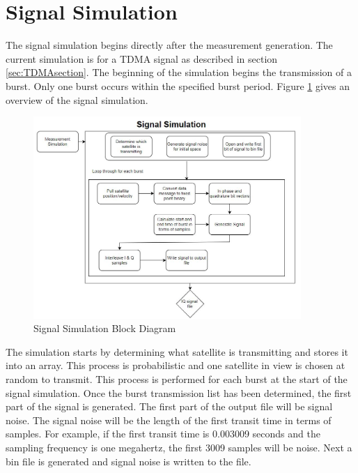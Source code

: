 \documentclass[12pt]{report}
\begin{document}
\section{Signal Simulation}

The signal simulation begins directly after the measurement generation. The current simulation is for a TDMA signal as described in section \ref{sec:TDMAsection}. The beginning of the simulation begins the transmission of a burst. Only one burst occurs within the specified burst period. Figure \ref{fig:SigSimBlock} gives an overview of the signal simulation.

\begin{figure}[h]
    \centering
    \includegraphics[width=4in]{SignalSimBlock}
    \caption{Signal Simulation Block Diagram}
    \label{fig:SigSimBlock}
\end{figure}



The simulation starts by determining what satellite is transmitting and stores it into an array. This process is probabilistic and one satellite in view is chosen at random to transmit. This process is performed for each burst at the start of the signal simulation. Once the burst transmission list has been determined, the first part of the signal is generated. The first part of the output file will be signal noise. The signal noise will be the length of the first transit time in terms of samples. For example, if the first transit time is 0.003009 seconds and the sampling frequency is one megahertz, the first 3009 samples will be noise. Next a bin file is generated and signal noise is written to the file. 
\end{document}
